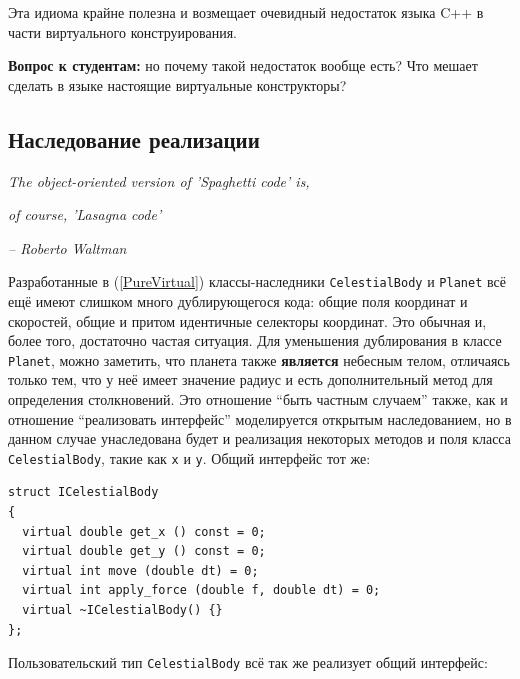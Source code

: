 \documentclass[a4paper,12pt,oneside]{article}
\newif\ifanswers
\begin{document}
Эта идиома крайне полезна и возмещает очевидный недостаток языка C++ в части виртуального конструирования.

\textbf{Вопрос к студентам:} но почему такой недостаток вообще есть? Что мешает сделать в языке настоящие виртуальные конструкторы?

\ifanswers
Правильный ответ: именно конструктор делает ту работу, которая должна быть сделана чтобы заработал механизм виртуальных функций. Поэтому в конструкторе класса виртуальные вызовы работают как не виртуальные. Поэтому даже если бы можно было сделать конструктор виртуальным, его вызов все равно был бы вызовом невиртуальной функции.
\fi

\pagebreak
\subsection{Наследование реализации}\label{ImplInheritance}

\hfill\textit{The object-oriented version of 'Spaghetti code' is,}

\hfill\textit{of course, 'Lasagna code'}{\vspace{0.5em}}

\hfill\textit{-- Roberto Waltman}

Разработанные в (\ref{PureVirtual}) классы-наследники \lstinline!CelestialBody! и \lstinline!Planet! всё ещё имеют слишком много дублирующегося кода: общие поля координат и скоростей, общие и притом идентичные селекторы координат. Это обычная и, более того, достаточно частая ситуация. Для уменьшения дублирования в классе \lstinline!Planet!, можно заметить, что планета также \textbf{является} небесным телом, отличаясь только тем, что у неё имеет значение радиус и есть дополнительный метод для определения столкновений. Это отношение ``быть частным случаем'' также, как и отношение ``реализовать интерфейс'' моделируется открытым наследованием, но в данном случае унаследована будет и реализация некоторых методов и поля класса \lstinline!CelestialBody!, такие как \lstinline!x! и \lstinline!y!. Общий интерфейс тот же:

\begin{lstlisting}
struct ICelestialBody
{
  virtual double get_x () const = 0;
  virtual double get_y () const = 0;
  virtual int move (double dt) = 0;
  virtual int apply_force (double f, double dt) = 0;
  virtual ~ICelestialBody() {}
};
\end{lstlisting}

Пользовательский тип \lstinline!CelestialBody! всё так же реализует общий интерфейс:
\end{document}
